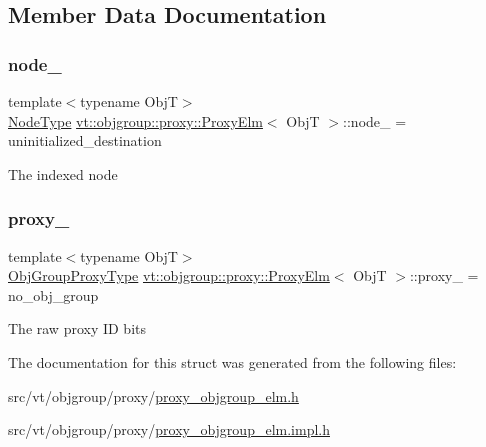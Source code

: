 \subsection{Member Data Documentation}
\mbox{\label{structvt_1_1objgroup_1_1proxy_1_1_proxy_elm_a0655b033581faad1cab6bf7402e36aac}} 
\subsubsection{\texorpdfstring{node\+\_\+}{node\_}}
{\footnotesize\ttfamily template$<$typename ObjT$>$ \\
\hyperlink{namespacevt_a866da9d0efc19c0a1ce79e9e492f47e2}{Node\+Type} \hyperlink{structvt_1_1objgroup_1_1proxy_1_1_proxy_elm}{vt\+::objgroup\+::proxy\+::\+Proxy\+Elm}$<$ ObjT $>$\+::node\+\_\+ = uninitialized\+\_\+destination\hspace{0.3cm}{\ttfamily [private]}}

The indexed node \mbox{\label{structvt_1_1objgroup_1_1proxy_1_1_proxy_elm_ab8a57044d257ea520a080de9f3389ba5}} 
\subsubsection{\texorpdfstring{proxy\+\_\+}{proxy\_}}
{\footnotesize\ttfamily template$<$typename ObjT$>$ \\
\hyperlink{namespacevt_ad7cae989df485fccca57f0792a880a8e}{Obj\+Group\+Proxy\+Type} \hyperlink{structvt_1_1objgroup_1_1proxy_1_1_proxy_elm}{vt\+::objgroup\+::proxy\+::\+Proxy\+Elm}$<$ ObjT $>$\+::proxy\+\_\+ = no\+\_\+obj\+\_\+group\hspace{0.3cm}{\ttfamily [private]}}

The raw proxy ID bits 

The documentation for this struct was generated from the following files\+:\begin{DoxyCompactItemize}
\item 
src/vt/objgroup/proxy/\hyperlink{proxy__objgroup__elm_8h}{proxy\+\_\+objgroup\+\_\+elm.\+h}\item 
src/vt/objgroup/proxy/\hyperlink{proxy__objgroup__elm_8impl_8h}{proxy\+\_\+objgroup\+\_\+elm.\+impl.\+h}\end{DoxyCompactItemize}
